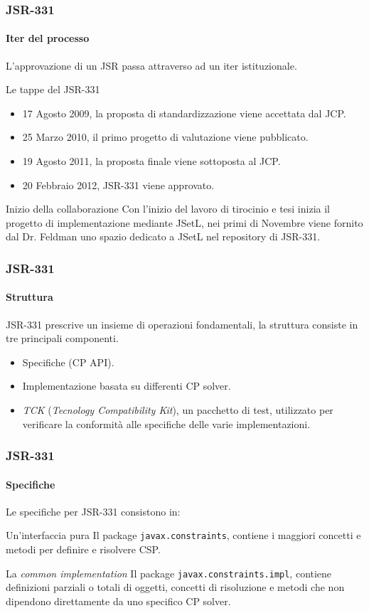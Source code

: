 \documentclass{beamer}
\begin{document}
\begin{frame}
\frametitle{JSR-331}
\framesubtitle{Iter del processo}
L'approvazione di un JSR passa attraverso ad un iter istituzionale.
\pause
\begin{block}{Le tappe del JSR-331}
\pause
  \begin{itemize}
  \item 17 Agosto 2009, la proposta di standardizzazione viene accettata dal
  JCP.
  \item 25 Marzo 2010, il primo progetto di valutazione viene pubblicato.
  \item 19 Agosto 2011, la proposta finale viene sottoposta al JCP.
  \item 20 Febbraio 2012, JSR-331 viene approvato.
  \end{itemize}
\end{block}
\pause
\begin{block}{Inizio della collaborazione}
Con l'inizio del lavoro di tirocinio e tesi
 inizia il progetto di implementazione mediante JSetL, nei
primi di Novembre viene fornito dal Dr. Feldman uno spazio dedicato a JSetL nel
repository di JSR-331.
\end{block}
\end{frame}

\begin{frame}
\frametitle{JSR-331}
\framesubtitle{Struttura}
JSR-331 prescrive un insieme di operazioni fondamentali,
la struttura consiste in tre principali componenti.
\pause
\begin{itemize}
\item Specifiche (CP API).
\item Implementazione basata su differenti CP solver.
\item \emph{TCK} (\emph{Tecnology Compatibility Kit}), un pacchetto di test,
utilizzato per verificare la conformità alle
specifiche delle varie implementazioni.
\end{itemize}
\end{frame}

\begin{frame}
\frametitle{JSR-331}
\framesubtitle{Specifiche}
Le specifiche per JSR-331 consistono in:
\pause
\begin{block}{Un'interfaccia pura}
Il package \alert{\texttt{javax.constraints}}, contiene i maggiori concetti e
metodi per definire e risolvere CSP.
\end{block}
\pause
\begin{block}{La \emph{common implementation}}
Il package \alert{\texttt{javax.constraints.impl}}, contiene definizioni
parziali o totali di oggetti, concetti di risoluzione e metodi che non
dipendono direttamente da uno specifico CP solver.
\end{block}
\end{frame}
\end{document}
